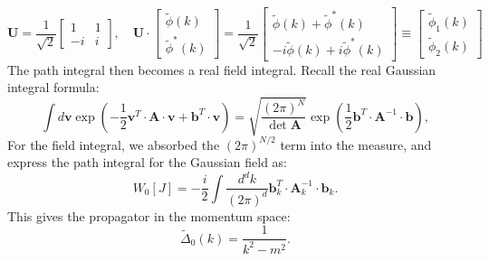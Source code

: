 \begin{equation*}
	\mathbf U = \frac{1}{\sqrt 2} \left[\begin{array}{cc}
		1 & 1 \\
		-i & i
	\end{array}\right], \quad
	\mathbf U \cdot \left[
	\begin{array}{c}
		\tilde{\phi}(k) \\ 
		\tilde{\phi}^*(k) 
	\end{array}\right] 
	= \frac{1}{\sqrt 2}\left[
	\begin{array}{c}
		\tilde\phi(k)+\tilde\phi^*(k) \\ 
		-i\tilde\phi(k)+i\tilde\phi^*(k)
	\end{array}\right]
	\equiv \left[
	\begin{array}{c}
		\tilde\phi_1(k) \\ 
		\tilde\phi_2(k) 
	\end{array}\right]
\end{equation*}
The path integral then becomes a real field integral.
Recall the real Gaussian integral formula:
\begin{equation}
	\int d\mathbf v \exp\left(-\frac{1}{2}\mathbf{v}^T \cdot \mathbf A\cdot \mathbf{v} + \mathbf{b}^T \cdot \bm{v}\right) 
	= \sqrt{\frac{(2\pi)^N}{\det{\mathbf A}}}\exp\left(\frac{1}{2}\mathbf{b}^T \cdot \mathbf{A}^{-1} \cdot \mathbf{b}\right),
	\label{eq:real-gaussian-integral}
\end{equation}
For the field integral, we absorbed the $(2\pi)^{N/2}$ term into the measure, and express the path integral for the Gaussian field as:
\begin{equation}
	W_0[J] 
	= -\frac{i}{2}\int \frac{d^d k}{(2\pi)^d} \mathbf b^T_k \cdot \mathbf A^{-1}_k \cdot \mathbf b_k.
\end{equation}
This gives the propagator in the momentum space:
\begin{equation*}
	\tilde{\Delta}_0(k) = \frac{1}{k^2-m^2}.
\end{equation*}


